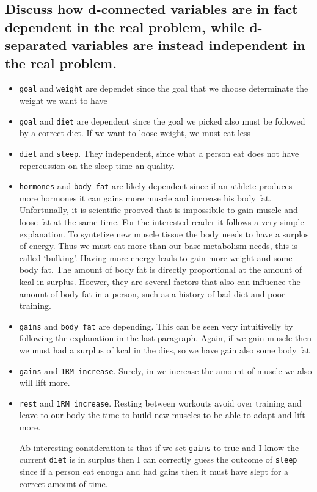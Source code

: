 \documentclass[11pt]{article}
\begin{document}
\subsection{Discuss how d-connected variables are in fact dependent in the real problem, while d-separated variables are instead independent in the real problem.}

\begin{itemize}
\item
  \texttt{goal} and \texttt{weight} are dependet since the goal that we
  choose determinate the weight we want to have
\item
  \texttt{goal} and \texttt{diet} are dependent since the goal we picked
  also must be followed by a correct diet. If we want to loose weight,
  we must eat less
\item
  \texttt{diet} and \texttt{sleep}. They independent, since what a
  person eat does not have repercussion on the sleep time an quality.
\item
  \texttt{hormones} and \texttt{body\ fat} are likely dependent since if
  an athlete produces more hormones it can gains more muscle and increase
  his body fat. Unfortunally, it is scientific prooved that is
  impossibile to gain muscle and loose fat at the same time. For the
  interested reader it follows a very simple explanation. To syntetize
  new muscle tissue the body needs to have a surplos of energy. Thus we
  must eat more than our base metabolism needs, this is called
  `bulking'. Having more energy leads to gain more weight and some body
  fat. The amount of body fat is directly proportional at the amount of
  kcal in surplus. Hoewer, they are several factors that also can
  influence the amount of body fat in a person, such as a history of bad
  diet and poor training.
\item
  \texttt{gains} and \texttt{body\ fat} are depending. This can be seen
  very intuitivelly by following the explanation in the last paragraph.
  Again, if we gain muscle then we must had a surplus of kcal in the
  dies, so we have gain also some body fat
\item
  \texttt{gains} and \texttt{1RM\ increase}. Surely, in we increase the
  amount of muscle we also will lift more.
\item
  \texttt{rest} and \texttt{1RM\ increase}. Resting between workouts
  avoid over training and leave to our body the time to build new
  muscles to be able to adapt and lift more.

  Ab interesting consideration is that if we set \texttt{gains} to true
  and I know the current \texttt{diet} is in surplus then I can
  correctly guess the outcome of \texttt{sleep} since if a person eat
  enough and had gains then it must have slept for a correct amount of
  time.
\end{itemize}
\end{document}
